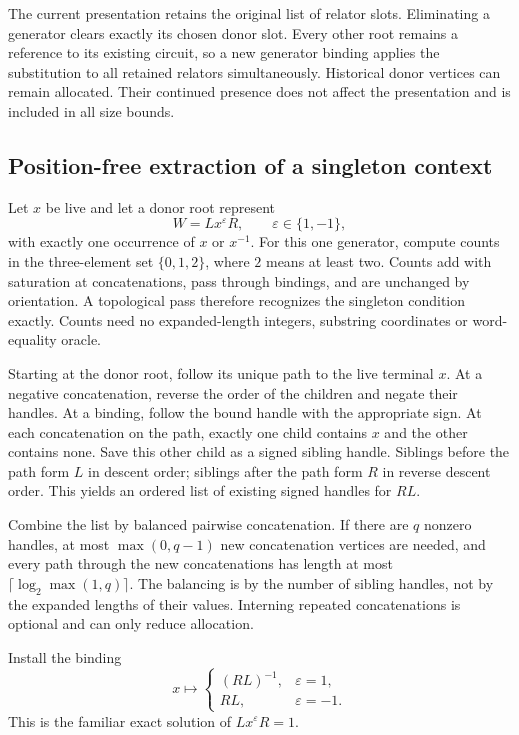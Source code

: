 The current presentation retains the original list of relator slots.
Eliminating a generator clears exactly its chosen donor slot. Every other
root remains a reference to its existing circuit, so a new generator
binding applies the substitution to all retained relators simultaneously.
Historical donor vertices can remain allocated. Their continued presence
does not affect the presentation and is included in all size bounds.

\subsection{Position-free extraction of a singleton context}

Let $x$ be live and let a donor root represent
\[
   W=Lx^\varepsilon R,\qquad \varepsilon\in\{1,-1\},
\]
with exactly one occurrence of $x$ or $x^{-1}$. For this one generator,
compute counts in the three-element set $\{0,1,2\}$, where $2$ means
at least two. Counts add with saturation at concatenations, pass through
bindings, and are unchanged by orientation. A topological pass therefore
recognizes the singleton condition exactly. Counts need no expanded-length
integers, substring coordinates or word-equality oracle.

Starting at the donor root, follow its unique path to the live terminal
$x$. At a negative concatenation, reverse the order of the children and
negate their handles. At a binding, follow the bound handle with the
appropriate sign. At each concatenation on the path, exactly one child
contains $x$ and the other contains none. Save this other child as a
signed sibling handle. Siblings before the path form $L$ in descent order;
siblings after the path form $R$ in reverse descent order. This yields an
ordered list of existing signed handles for $RL$.

Combine the list by balanced pairwise concatenation. If there are $q$
nonzero handles, at most $\max(0,q-1)$ new concatenation vertices are
needed, and every path through the new concatenations has length at most
$\lceil\log_2\max(1,q)\rceil$. The balancing is by the number of sibling
handles, not by the expanded lengths of their values. Interning repeated
concatenations is optional and can only reduce allocation.

Install the binding
\begin{equation}\label{eq:persistent-binding}
 x\longmapsto
 \begin{cases}
   (RL)^{-1},&\varepsilon=1,\\
   RL,&\varepsilon=-1.
 \end{cases}
\end{equation}
This is the familiar exact solution of $Lx^\varepsilon R=1$.

